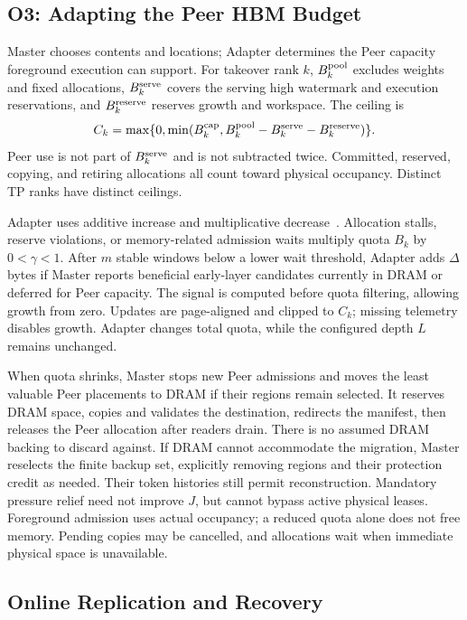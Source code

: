 \subsection{O3: Adapting the Peer HBM Budget}
\label{sec:teacher-capacity}

Master chooses contents and locations; Adapter determines the Peer
capacity foreground execution can support. For takeover rank $k$,
$B^{\rm pool}_k$ excludes weights and fixed allocations,
$B^{\rm serve}_k$ covers the serving high watermark and execution
reservations, and $B^{\rm reserve}_k$ reserves growth and workspace.
The ceiling is
\begin{equation}
 C_k=\max\{0,\min(B^{\rm cap}_k,
 B^{\rm pool}_k-B^{\rm serve}_k-B^{\rm reserve}_k)\}.
 \label{eq:teacher-ceiling}
\end{equation}
Peer use is not part of $B^{\rm serve}_k$ and is not subtracted twice.
Committed, reserved, copying, and retiring allocations all count toward
physical occupancy. Distinct TP ranks have distinct ceilings.

Adapter uses additive increase and multiplicative
decrease~\cite{chiu1989aimd}. Allocation stalls, reserve violations, or
memory-related admission waits multiply quota $B_k$ by $0<\gamma<1$.
After $m$ stable windows below a lower wait threshold, Adapter adds
$\Delta$ bytes if Master reports beneficial early-layer candidates
currently in DRAM or deferred for Peer capacity. The signal is computed
before quota filtering, allowing growth from zero. Updates are
page-aligned and clipped to $C_k$; missing telemetry disables growth.
Adapter changes total quota, while the configured depth $L$ remains
unchanged.

When quota shrinks, Master stops new Peer admissions and moves the
least valuable Peer placements to DRAM if their regions remain selected.
It reserves DRAM space, copies and validates the destination, redirects
the manifest, then releases the Peer allocation after readers drain.
There is no assumed DRAM backing to discard against. If DRAM cannot
accommodate the migration, Master reselects the finite backup set,
explicitly removing regions and their protection credit as needed.
Their token histories still permit reconstruction. Mandatory pressure
relief need not improve $J$, but cannot bypass active physical leases.
Foreground admission uses actual occupancy; a reduced quota alone
does not free memory. Pending copies may be cancelled, and allocations
wait when immediate physical space is unavailable.

\subsection{Online Replication and Recovery}
\label{sec:teacher-execution}

